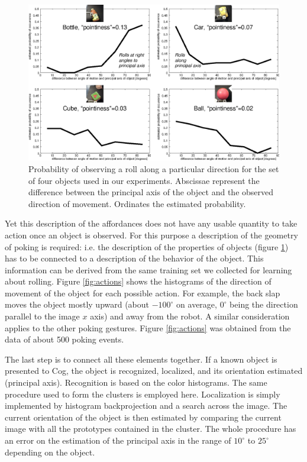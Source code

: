 \begin{figure}[tbh]
\begin{center}
\includegraphics[width=\columnwidth]{affordances.eps}
\caption{ 
\label{fig:affordances}
%
Probability of observing a roll along a particular direction for the set
of four objects used in our experiments. Abscissae represent the difference
between the principal axis of the object and the observed direction of 
movement. Ordinates the estimated probability.
%
}
\end{center}
\end{figure}

Yet this description of the affordances does not have any usable quantity to 
take action once an object is observed. For this purpose a description of 
the geometry of poking is required: i.e. the description of the properties of 
objects (figure \ref{fig:affordances}) has to be connected to a description
of the behavior of the object. 
This information can be derived from the same training set we collected for learning
about rolling. Figure \ref{fig:actions} shows the histograms of the direction 
of movement of the object for
each possible action. For example, the back slap moves the object mostly upward
(about $-100^\circ$ on average, $0^\circ$ being the direction parallel to the image
$x$ axis) and away from the robot. A similar consideration applies
to the other poking gestures. Figure \ref{fig:actions} was obtained from the data of
about 500 poking events.

The last step is to connect all these elements together. If a known object is
presented to Cog, the object is recognized, localized, and
its orientation estimated (principal axis). Recognition is based on the color histograms. The same
procedure used to form the clusters is employed here. Localization is simply implemented 
by histogram backprojection and a search across the image. The current orientation of the
object is then estimated by comparing the current image with all the prototypes 
contained in the cluster. The whole procedure has an error on the estimation
of the principal axis in the range of $10^\circ$ to $25^\circ$ depending on the object.  

